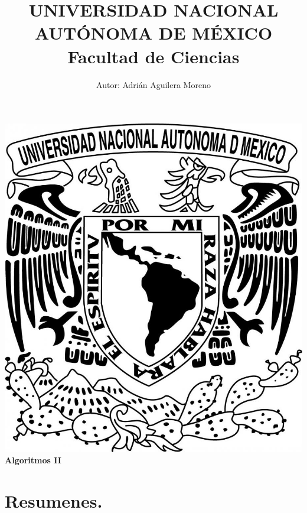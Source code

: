 \documentclass{article}
\begin{document}
\title{UNIVERSIDAD NACIONAL AUT\'ONOMA DE M\'EXICO\\ Facultad de Ciencias}
\author{Autor: Adri\'an Aguilera Moreno}
\date{}
\maketitle
\begin{center}
  \includegraphics[scale=0.20]{../Imagen/Portada.jpg}\\[0.4cm]
  \Large
  \bf{Algoritmos II}
  \normalsize
\end{center}
\newpage
{}
\section*{\LARGE{Resumenes.}}

\newpage

\newpage

\newpage

\newpage

\end{document}
